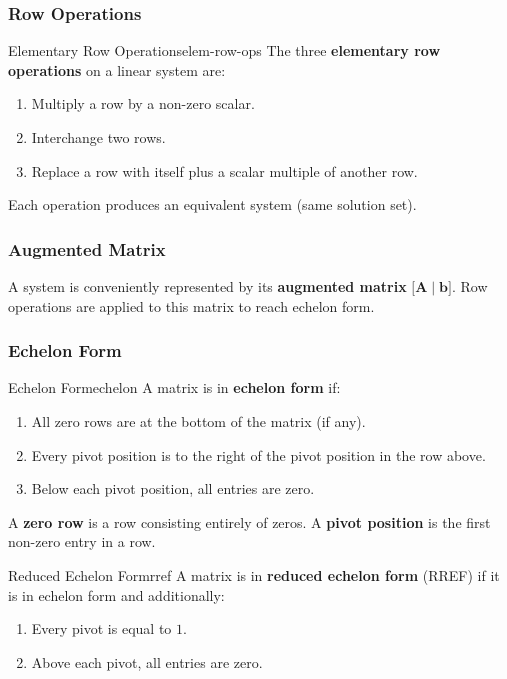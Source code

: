 \subsubsection{Row Operations}

\begin{definition}{Elementary Row Operations}{elem-row-ops}
  The three \textbf{elementary row operations} on a linear system are:
  \begin{enumerate}
    \item Multiply a row by a non-zero scalar.
    \item Interchange two rows.
    \item Replace a row with itself plus a scalar multiple of another row.
  \end{enumerate}
  Each operation produces an equivalent system (same solution set).
\end{definition}

\subsubsection{Augmented Matrix}

A system is conveniently represented by its \textbf{augmented matrix}
$\bigl[\mathbf{A} \mid \mathbf{b}\bigr]$. Row operations are applied to this matrix to reach echelon form.

\subsubsection{Echelon Form}

\begin{definition}{Echelon Form}{echelon}
  A matrix is in \textbf{echelon form} if:
  \begin{enumerate}
    \item All zero rows are at the bottom of the matrix (if any).
    \item Every pivot position is to the right of the pivot position in the row above.
    \item Below each pivot position, all entries are zero.
  \end{enumerate}
  A \textbf{zero row} is a row consisting entirely of zeros. A \textbf{pivot position} is the first non-zero entry in a row.
\end{definition}

\begin{definition}{Reduced Echelon Form}{rref}
  A matrix is in \textbf{reduced echelon form} (RREF) if it is in echelon form and additionally:
  \begin{enumerate}
    \item Every pivot is equal to $1$.
    \item Above each pivot, all entries are zero.
  \end{enumerate}
\end{definition}

